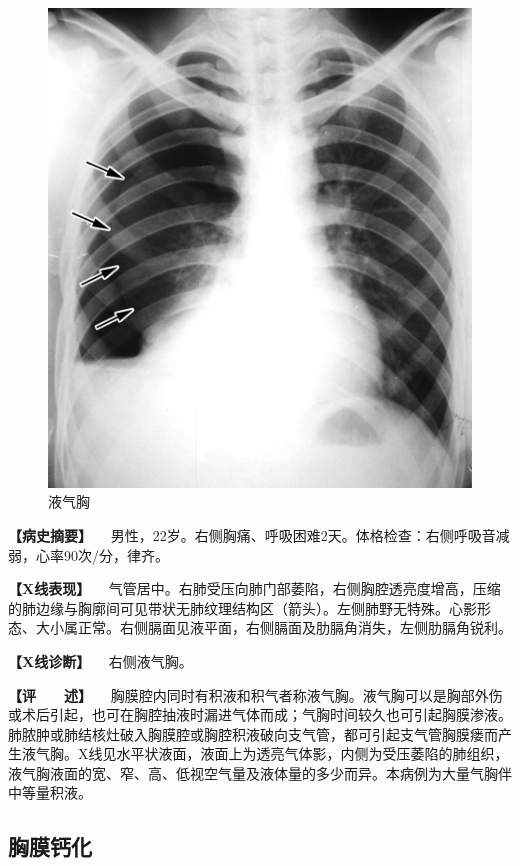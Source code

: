 \begin{figure}[!htbp]
 \centering
 \includegraphics{./images/Image00191.jpg}
 \captionsetup{justification=centering}
 \caption{液气胸}
 \label{fig3-11-5}
  \end{figure} 

\textbf{【病史摘要】}
　男性，22岁。右侧胸痛、呼吸困难2天。体格检查：右侧呼吸音减弱，心率90次/分，律齐。

\textbf{【X线表现】}
　气管居中。右肺受压向肺门部萎陷，右侧胸腔透亮度增高，压缩的肺边缘与胸廓间可见带状无肺纹理结构区（箭头）。左侧肺野无特殊。心影形态、大小属正常。右侧膈面见液平面，右侧膈面及肋膈角消失，左侧肋膈角锐利。

\textbf{【X线诊断】} 　右侧液气胸。

\textbf{【评　　述】}
　胸膜腔内同时有积液和积气者称液气胸。液气胸可以是胸部外伤或术后引起，也可在胸腔抽液时漏进气体而成；气胸时间较久也可引起胸膜渗液。肺脓肿或肺结核灶破入胸膜腔或胸腔积液破向支气管，都可引起支气管胸膜瘘而产生液气胸。X线见水平状液面，液面上为透亮气体影，内侧为受压萎陷的肺组织，液气胸液面的宽、窄、高、低视空气量及液体量的多少而异。本病例为大量气胸伴中等量积液。

\subsection{胸膜钙化}

